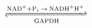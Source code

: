 \documentclass[preview]{standalone}
\begin{document}
\begin{align*}
\xrightleftharpoons[\text{GAPDH}]{\text{NAD}^{+} + \text{P}_i \:\rightarrow\: \text{NADH}^{+}\text{H}^{+}}
\end{align*}
\end{document}
